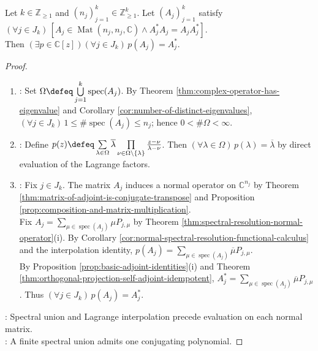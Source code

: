 \begin{lemma} \label{lem:adjoints-of-finitely-many-normal-matrices-polynomial} \\
Let $k\in\mathbb{Z}_{\geq1}$ and $(n_j)_{j=1}^{k}\in\mathbb{Z}_{\geq1}^{k}$. Let $(A_j)_{j=1}^{k}$ satisfy $(\forall j\in J_k)\,[A_j\in\operatorname{Mat}(n_j,n_j,\mathbb{C})\land A_j^*A_j=A_jA_j^*]$.\\
Then $(\exists p\in\mathbb{C}[z])(\forall j\in J_k)\,p(A_j)=A_j^*$.
\begin{proof}
\begin{enumerate}[label=(\roman*)]
\setlength{\itemsep}{0pt}
\item {}: Set $\Omega\defeq\bigcup\limits_{j=1}^{k}\operatorname{spec}(A_j)$. By Theorem \ref{thm:complex-operator-has-eigenvalue} and Corollary \ref{cor:number-of-distinct-eigenvalues}, $(\forall j\in J_k)\,1\leq\#\operatorname{spec}(A_j)\leq n_j$; hence $0<\#\Omega<\infty$.
\item {}: Define $p(z)\defeq\sum\limits_{\lambda\in\Omega}\overline{\lambda}\prod\limits_{\nu\in\Omega\setminus\{\lambda\}}\frac{z-\nu}{\lambda-\nu}$. Then $(\forall\lambda\in\Omega)\,p(\lambda)=\overline{\lambda}$ by direct evaluation of the Lagrange factors.
\item {}: Fix $j\in J_k$. The matrix $A_j$ induces a normal operator on $\mathbb{C}^{n_j}$ by Theorem \ref{thm:matrix-of-adjoint-is-conjugate-transpose} and Proposition \ref{prop:composition-and-matrix-multiplication}.\\
Fix $A_j=\sum\limits_{\mu\in\operatorname{spec}(A_j)}\mu P_{j,\mu}$ by Theorem \ref{thm:spectral-resolution-normal-operator}(i). By Corollary \ref{cor:normal-spectral-resolution-functional-calculus} and the interpolation identity, $p(A_j)=\sum\limits_{\mu\in\operatorname{spec}(A_j)}\overline{\mu}P_{j,\mu}$.\\
By Proposition \ref{prop:basic-adjoint-identities}(i) and Theorem \ref{thm:orthogonal-projection-self-adjoint-idempotent}, $A_j^*=\sum\limits_{\mu\in\operatorname{spec}(A_j)}\overline{\mu}P_{j,\mu}$. Thus $(\forall j\in J_k)\,p(A_j)=A_j^*$.
\end{enumerate}
: Spectral union and Lagrange interpolation precede evaluation on each normal matrix.\\
: A finite spectral union admits one conjugating polynomial.
\end{proof}
\end{lemma}

